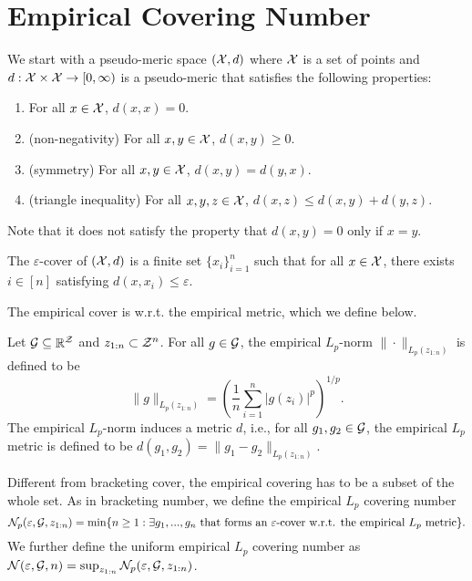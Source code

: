 \documentclass[twoside]{article}
\begin{document}
\section{Empirical Covering Number}
We start with a pseudo-meric space $(\mathcal{X},d)$ where $\mathcal{X}$ is a set of points and $d:\mathcal{X}\times\mathcal{X}\to [0,\infty)$ is a pseudo-meric that satisfies the following properties:
\begin{enumerate}
   \item For all $x\in \mathcal{X}$, $d(x,x)=0$.
   \item (non-negativity) For all $x,y\in \mathcal{X}$, $d(x,y)\ge 0$.
   \item (symmetry) For all $x,y\in \mathcal{X}$, $d(x,y)=d(y,x)$.
   \item (triangle inequality) For all $x,y,z\in \mathcal{X}$, $d(x,z)\le d(x,y)+d(y,z)$.
\end{enumerate}
Note that it does not satisfy the property that $d(x,y)=0$ only if $x=y$. 
\begin{definition}
   The $\varepsilon$-cover of $(\mathcal{X},d)$ is a finite set $\{x_i\}_{i=1}^n$ such that for all $x\in \mathcal{X}$, there exists $i\in [n]$ satisfying $d(x,x_i)\le \varepsilon$.
\end{definition}
The empirical cover is w.r.t. the empirical metric, which we define below.
\begin{definition}
   Let $\mathcal{G}\subseteq \mathbb{R}^{\mathcal{Z}}$  and $z_{1:n}\subset \mathcal{Z}^n$. For all $g\in \mathcal{G}$, the empirical $L_p$-norm $\|\cdot\|_{L_p(z_{1:n})}$ is defined to be
   \begin{equation*}
      \|g\|_{L_p(z_{1:n})}=\left(\frac{1}{n}\sum_{i=1}^n |g(z_i)|^p\right)^{1/p}.
   \end{equation*}
   The empirical $L_p$-norm induces a metric $d$, i.e., for all $g_1,g_2\in \mathcal{G}$, the empirical $L_p$ metric is defined to be $d(g_1,g_2)=\|g_1-g_2\|_{L_p(z_{1:n})}$.
\end{definition}
Different from bracketing cover, the empirical covering has to be a subset of the whole set. 
As in bracketing number, we define the empirical $L_p$ covering number \[\mathcal{N}_p(\varepsilon,\mathcal{G}, z_{1:n})=\min\{n\ge 1:\exists g_1,...,g_n \text{ that forms an $\varepsilon$-cover w.r.t. the empirical $L_p$ metric}\}.\] We further define the uniform empirical $L_p$ covering number as $\mathcal{N}(\varepsilon,\mathcal{G}, n)=\sup_{z_{1:n}}\mathcal{N}_p(\varepsilon,\mathcal{G}, z_{1:n})$. 
\end{document}
